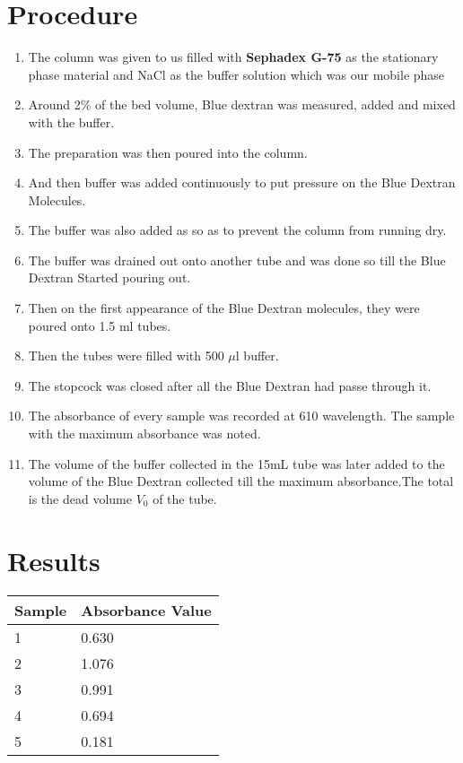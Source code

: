 \documentclass{article}
\begin{document}
        \section{Procedure}
        \begin{enumerate}
            \item The column was given to us filled with \textbf{Sephadex G-75} as the stationary phase material and NaCl as the buffer solution which was our mobile phase
            \item Around 2\% of the bed volume, Blue dextran was measured, added and mixed with the buffer.
            \item The preparation was then poured into the column.
            \item And then buffer was added continuously to put pressure on the Blue Dextran Molecules.
            \item The buffer was also added as so as to prevent the column from running dry.
            \item The buffer was drained out onto another tube and was done so till the Blue Dextran Started pouring out.
            \item Then on the first appearance of the Blue Dextran molecules, they were poured onto 1.5 ml tubes.
            \item Then the tubes were filled with 500 $\mu$l buffer.
            \item The stopcock was closed after all the Blue Dextran had passe through it.
            \item The absorbance of every sample was recorded at 610 wavelength. The sample with the maximum absorbance was noted.
            \item The volume of the buffer collected in the 15mL tube was later added to the volume of the Blue Dextran collected till the maximum absorbance.The total is the dead volume
                $V_0$ of the tube.
        \end{enumerate}
        \section{Results}
    \begin{table}[!h]
    \centering
        
        \begin{tabular}{|p{}|p{}|}
        \hline 
        Sample & Absorbance Value \\
            \hline 
            1 & 0.630 \\ 
            \hline 
            2 & 1.076 \\
            \hline 
            3 & 0.991 \\
            \hline 
            4 & 0.694 \\
            \hline 
            5 & 0.181 \\
                \hline
        \end{tabular}
    \end{table}
\end{document}
